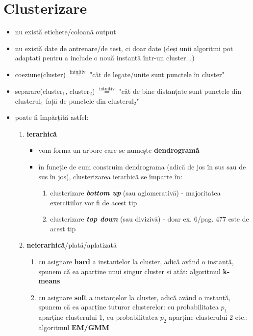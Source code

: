 \documentclass[12pt]{article}
\begin{document}
	\section{Clusterizare}
	\begin{itemize}
		\item nu există etichete/coloană output
		\item nu există date de antrenare/de test, ci doar date (deși unii algoritmi pot adaptați pentru a include o nouă instanță într-un cluster...)
		\item coeziune(cluster) $\stackrel{\text{intuitiv}}{=}$ "cât de legate/unite sunt punctele în cluster"
		\item separare(cluster$_1$, cluster$_2$) $\stackrel{\text{intuitiv}}{=}$ "cât de bine distanțate sunt punctele din clusterul$_1$ față de punctele din clusterul$_2$"
		\newpage
		\item poate fi împărțită astfel:
		\begin{enumerate}
			\item \textbf{ierarhică}
			\begin{itemize}
				\item vom forma un arbore care se numește \textbf{dendrogramă}
				\item în funcție de cum construim dendrograma (adică de jos în sus sau de sus în jos), clusterizarea ierarhică se împarte în:
				\begin{enumerate}
					\item clusterizare \textit{\textbf{bottom up}} (sau aglomerativă) - majoritatea exercițiilor vor fi de acest tip
					\item clusterizare \textit{\textbf{top down}} (sau divizivă) - doar ex. 6/pag. 477 este de acest tip
				\end{enumerate}
			\end{itemize}
			\item \textbf{neierarhică}/plată/aplatizată
			\begin{enumerate}
				\item cu asignare \textbf{hard} a instanțelor la cluster, adică având o instanță, spunem că ea aparține unui singur cluster și atât: algoritmul \textbf{k-means}
				\item cu asignare \textbf{soft} a instanțelor la cluster, adică având o instanță, spunem că ea aparține tuturor clusterelor: cu probabilitatea $p_1$ aparține clusterului 1, cu probabilitatea $p_2$ aparține clusterului 2 etc.: algoritmul \textbf{EM/GMM}
			\end{enumerate}
		\end{enumerate}
	\end{itemize}
	
\end{document}
